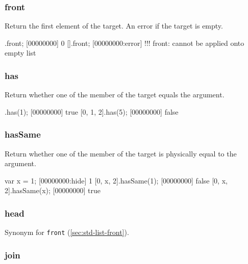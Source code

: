 
\begin{urbiscript}

\end{urbiscript}

\subsubsection{front}
\label{sec:std-list-front}

Return the first element of the target. An error if the target is
empty.

\begin{urbiscript}
[0, 1, 2].front;
[00000000] 0
[].front;
[00000000:error] !!! front: cannot be applied onto empty list
\end{urbiscript}

\subsubsection{has}

Return whether one of the member of the target equals the argument.

\begin{urbiscript}
[0, 1, 2].has(1);
[00000000] true
[0, 1, 2].has(5);
[00000000] false
\end{urbiscript}

\subsubsection{hasSame}

Return whether one of the member of the target is physically equal to
the argument.

\begin{urbiscript}
var x = 1;
[00000000:hide] 1
[0, x, 2].hasSame(1);
[00000000] false
[0, x, 2].hasSame(x);
[00000000] true
\end{urbiscript}

\subsubsection{head}

Synonym for \lstinline|front| (\autoref{sec:std-list-front}).

\subsubsection{join}

